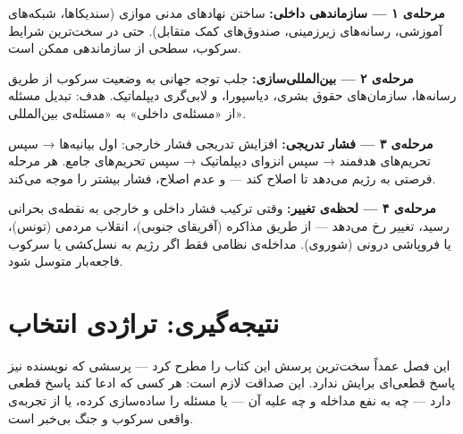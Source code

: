 \begin{tcolorbox}[wavebox, title={الگوی رهایی ترکیبی: چهار مرحله}]
\textbf{مرحله‌ی ۱ — سازماندهی داخلی:}
ساختن نهادهای مدنی موازی (سندیکاها، شبکه‌های آموزشی، رسانه‌های زیرزمینی، صندوق‌های کمک متقابل). حتی در سخت‌ترین شرایط سرکوب، سطحی از سازماندهی ممکن است.

\textbf{مرحله‌ی ۲ — بین‌المللی‌سازی:}
جلب توجه جهانی به وضعیت سرکوب از طریق رسانه‌ها، سازمان‌های حقوق بشری، دیاسپورا، و لابی‌گری دیپلماتیک. هدف: تبدیل مسئله از «مسئله‌ی داخلی» به «مسئله‌ی بین‌المللی».

\textbf{مرحله‌ی ۳ — فشار تدریجی:}
افزایش تدریجی فشار خارجی: اول بیانیه‌ها → سپس تحریم‌های هدفمند → سپس انزوای دیپلماتیک → سپس تحریم‌های جامع. هر مرحله فرصتی به رژیم می‌دهد تا اصلاح کند — و عدم اصلاح، فشار بیشتر را موجه می‌کند.

\textbf{مرحله‌ی ۴ — لحظه‌ی تغییر:}
وقتی ترکیب فشار داخلی و خارجی به نقطه‌ی بحرانی رسید، تغییر رخ می‌دهد — از طریق مذاکره (آفریقای جنوبی)، انقلاب مردمی (تونس)، یا فروپاشی درونی (شوروی). مداخله‌ی نظامی فقط اگر رژیم به نسل‌کشی یا سرکوب فاجعه‌بار متوسل شود.
\end{tcolorbox}


\section{نتیجه‌گیری: تراژدی انتخاب}
\label{sec:ch15-conclusion}

این فصل عمداً سخت‌ترین پرسش این کتاب را مطرح کرد — پرسشی که نویسنده نیز پاسخ قطعی‌ای برایش ندارد. این صداقت لازم است: هر کسی که ادعا کند پاسخ قطعی دارد — چه به نفع مداخله و چه علیه آن — یا مسئله را ساده‌سازی کرده، یا از تجربه‌ی واقعی سرکوب و جنگ بی‌خبر است.

